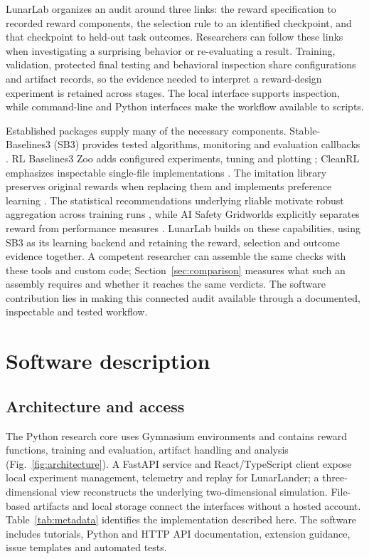 \documentclass[preprint,12pt]{elsarticle}
\begin{document}
LunarLab organizes an audit around three links: the reward specification to recorded reward components, the selection rule to an identified checkpoint, and that checkpoint to held-out task outcomes. Researchers can follow these links when investigating a surprising behavior or re-evaluating a result. Training, validation, protected final testing and behavioral inspection share configurations and artifact records, so the evidence needed to interpret a reward-design experiment is retained across stages. The local interface supports inspection, while command-line and Python interfaces make the workflow available to scripts.

Established packages supply many of the necessary components. Stable-Baselines3 (SB3) provides tested algorithms, monitoring and evaluation callbacks \citep{raffin2021sb3}. RL Baselines3 Zoo adds configured experiments, tuning and plotting \citep{raffin2020zoo}; CleanRL emphasizes inspectable single-file implementations \citep{huang2022cleanrl}. The imitation library preserves original rewards when replacing them and implements preference learning \citep{gleave2022imitation}. The statistical recommendations underlying rliable motivate robust aggregation across training runs \citep{agarwal2021precipice}, while AI Safety Gridworlds explicitly separates reward from performance measures \citep{leike2017gridworlds}. LunarLab builds on these capabilities, using SB3 as its learning backend and retaining the reward, selection and outcome evidence together. A competent researcher can assemble the same checks with these tools and custom code; Section~\ref{sec:comparison} measures what such an assembly requires and whether it reaches the same verdicts. The software contribution lies in making this connected audit available through a documented, inspectable and tested workflow.

\section{Software description}
\subsection{Architecture and access}
The Python research core uses Gymnasium environments \citep{towers2025gymnasium} and contains reward functions, training and evaluation, artifact handling and analysis (Fig.~\ref{fig:architecture}). A FastAPI service and React/TypeScript client expose local experiment management, telemetry and replay for LunarLander; a three-dimensional view reconstructs the underlying two-dimensional simulation. File-based artifacts and local storage connect the interfaces without a hosted account. Table~\ref{tab:metadata} identifies the implementation described here. The software includes tutorials, Python and HTTP API documentation, extension guidance, issue templates and automated tests.
\end{document}

